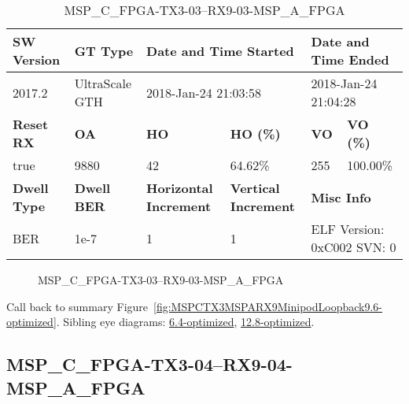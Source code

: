\begin{table}[h]
\centering
\caption{MSP\_C\_FPGA-TX3-03--RX9-03-MSP\_A\_FPGA}
\label{tab:MSPCFPGATX303RX903MSPAFPGA9.6-optimized}
\begin{tabular}{@{}|l|l|l|l|l|l|@{}}
\toprule
\textbf{SW Version}                & \textbf{GT Type}   & \multicolumn{2}{l|}{\textbf{Date and Time Started}}            & \multicolumn{2}{l|}{\textbf{Date and Time Ended}}        \\ \midrule
2017.2                       & UltraScale GTH          & \multicolumn{2}{l|}{2018-Jan-24 21:03:58}                   & \multicolumn{2}{l|}{2018-Jan-24 21:04:28}               \\ \midrule
\textbf{Reset RX}                  & \textbf{OA} & \textbf{HO}   & \textbf{HO (\%)} & \textbf{VO} & \textbf{VO (\%)} \\ \midrule
true & 9880        & 42          & 64.62\%        & 255        & 100.00\%       \\ \midrule
\textbf{Dwell Type}                & \textbf{Dwell BER} & \textbf{Horizontal Increment} & \textbf{Vertical Increment}    & \multicolumn{2}{l|}{\textbf{Misc Info}}                  \\ \midrule
BER                            & 1e-7        & 1        & 1           & \multicolumn{2}{l|}{ELF Version: 0xC002 SVN: 0}                         \\ \bottomrule
\end{tabular}
\end{table}

\begin{figure}[h]
\caption{MSP\_C\_FPGA-TX3-03--RX9-03-MSP\_A\_FPGA} \label{fig:MSPCFPGATX303RX903MSPAFPGA9.6-optimized}
\end{figure}

Call back to summary Figure~\ref{fig:MSPCTX3MSPARX9MinipodLoopback9.6-optimized}.
Sibling eye diagrams: \hyperref[sec:MSPCFPGATX303RX903MSPAFPGA6.4-optimized]{6.4-optimized}, \hyperref[sec:MSPCFPGATX303RX903MSPAFPGA12.8-optimized]{12.8-optimized}.

\clearpage
\newpage


\subsection{MSP\_C\_FPGA-TX3-04--RX9-04-MSP\_A\_FPGA}\label{sec:MSPCFPGATX304RX904MSPAFPGA9.6-optimized}

